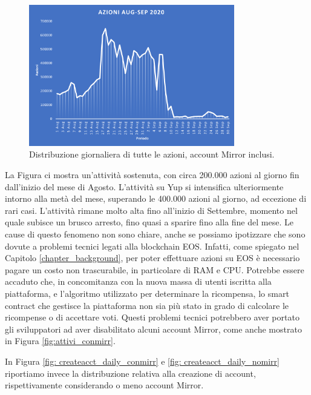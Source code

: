 \begin{figure}[t]
    \centering
    \includegraphics[width=0.8\textwidth]{graphs/daily_azioni.png}
    \caption{Distribuzione giornaliera di tutte le azioni, account Mirror inclusi.}
    \label{fig: actions_daily}
\end{figure}

La Figura ci mostra un'attività sostenuta, con circa 200.000 azioni al giorno fin dall'inizio del mese di Agosto.
L'attività su Yup si intensifica ulteriormente intorno alla metà del mese, superando le 400.000 azioni al giorno, ad eccezione di rari casi.
L'attività rimane molto alta fino all'inizio di Settembre, momento nel quale subisce un brusco arresto, fino quasi a sparire fino alla fine del mese.
Le cause di questo fenomeno non sono chiare, anche se possiamo ipotizzare che sono dovute a problemi tecnici legati alla blockchain EOS.
Infatti, come spiegato nel Capitolo \ref{chapter_background}, per poter effettuare azioni su EOS è necessario pagare un costo non trascurabile, in particolare di RAM e CPU.
Potrebbe essere accaduto che, in concomitanza con la nuova massa di utenti iscritta alla piattaforma, e l'algoritmo utilizzato per determinare la ricompensa, lo smart contract che gestisce la piattaforma non sia più stato in grado di calcolare le ricompense o di accettare voti.
Questi problemi tecnici potrebbero aver portato gli sviluppatori ad aver disabilitato alcuni account Mirror, come anche mostrato in Figura \ref{fig:attivi_conmirr}.

In Figura \ref{fig: createacct_daily_conmirr} e \ref{fig: createacct_daily_nomirr} riportiamo invece la distribuzione relativa alla creazione di account, rispettivamente considerando o meno account Mirror.


